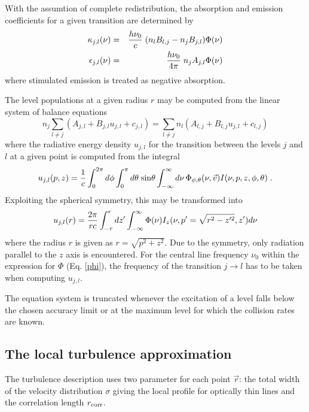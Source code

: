 With the assumtion of complete redistribution, the absorption and 
emission coefficients for a given transition are determined by
\begin{eqnarray}
\kappa_{j,l}(\nu)&=&{h\nu_0 \over c} \;(n_l B_{l,j}-n_j B_{j,l}) \Phi(\nu)\\
\epsilon_{j,l}(\nu)&=&{h\nu_0 \over 4\pi}\; n_{j} A_{j,l} \Phi(\nu)
\label{kappa}
\end{eqnarray}
where stimulated emission is treated as negative absorption.

The level populations at a given radius $r$ may be computed
from the linear system of balance equations
\begin{equation}
n_j \sum_{l\ne j}\left( A_{j,l}+B_{j,l}u_{j,l}+ c_{j,l}\right) =
\sum_{l \ne j} n_l \left(A_{l,j}+B_{l,j}u_{j,l}+ c_{l,j}\right)
\label{balance}
\end{equation}
where the radiative energy density $u_{j,l}$ for the transition between
the levels $j$ and $l$ at a given point is computed from the integral
\begin{equation}
u_{j,l}(p,z) = {1 \over c} \int_0^{2\pi}d\phi \int_0^\pi d\theta\; {\rm sin} \theta
\int_{-\infty}^{\infty} d\nu \,\Phi_{\phi,\theta}(\nu,\vec{v}) 
I(\nu,p,z,\phi,\theta)\;.
\end{equation}
Exploiting the spherical symmetry, this may be transformed into
\begin{equation}
u_{j,l}(r) = {2\pi\over r c} \int_{-r}^r dz' \int_{-\infty}^\infty
\Phi(\nu) I_z(\nu,p'=\sqrt{r^2-z'^2},z') d\nu
\label{uzint}
\end{equation}
where the radius $r$ is given as $r=\sqrt{p^2+z^2}$.
Due to the symmetry, only radiation parallel to the $z$ axis is 
encountered. For the central line frequency $\nu_0$ within the 
expression for $\Phi$ (Eq. \ref{phi}),
the frequency of the transition $j \rightarrow l$ has to be taken
when computing $u_{j,l}$.

The equation system is truncated whenever the excitation of a level
falls below the chosen accuracy limit or at the maximum level for
which the collision rates are known.

\subsection{The local turbulence approximation}

The turbulence description uses two parameter for each point $\vec{r}$:
the total width of the velocity distribution $\sigma$ giving the
local profile for optically thin lines and the correlation length
$r_{\rm corr}$.

